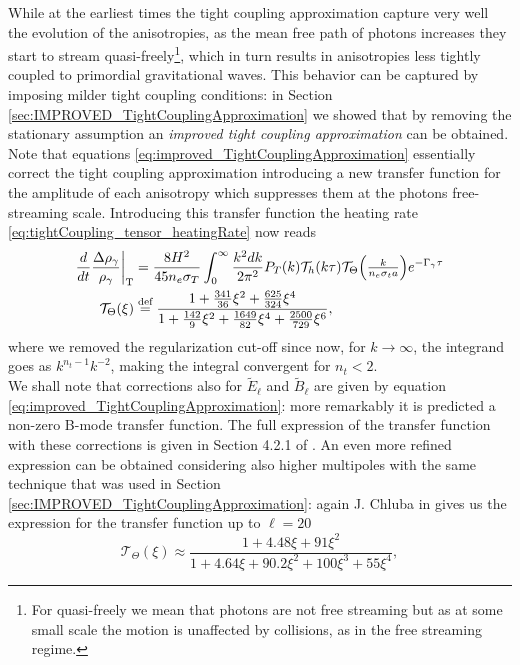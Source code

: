 While at the earliest times the tight coupling approximation capture very well the evolution of the anisotropies, as the mean free path of photons increases they start to stream quasi-freely\footnote{For quasi-freely we mean that photons are not free streaming but as at some small scale the motion is unaffected by collisions, as in the free streaming regime.}, which in turn results in anisotropies less tightly coupled to primordial gravitational waves. This behavior can be captured by imposing milder tight coupling conditions: in Section \ref{sec:IMPROVED_TightCouplingApproximation} we showed that by removing the stationary assumption an \emph{improved tight coupling approximation} can be obtained. Note that equations \eqref{eq:improved_TightCouplingApproximation} essentially correct the tight coupling approximation introducing a new transfer function for the amplitude of each anisotropy which suppresses them at the photons free-streaming scale. Introducing this transfer function the heating rate \eqref{eq:tightCoupling_tensor_heatingRate} now reads
\begin{align}\label{eq:impTightCoupling_tensor_heatingRate}
         \frac{d}{dt}\frac{\Delta\rho_\gamma}{\rho_\gamma}\bigg|_\text{T}&=\frac{8H^2}{45n_e\sigma_T}\int_0^{\infty}\frac{k^2dk}{2\pi^2}{P}_T (k)\mathcal{T}_h(k\tau)\mathcal{T}_\Theta \Big(\tfrac{k}{n_e\sigma_ta}\Big)e^{-\Gamma_\gamma\tau}\\
    \mathcal{T}_\Theta(\xi)&\stackrel{\text{def}}{=} \frac{1+\frac{341}{36}\xi^2+\frac{625}{324}\xi^4}{1+\frac{142}{9}\xi^2+\frac{1649}{82}\xi^4+\frac{2500}{729}\xi^6},\nonumber
\end{align}
where we removed the regularization cut-off since now, for $k\to\infty$, the integrand goes as $k^{n_t-1}k^{-2}$, making the integral convergent for $n_t<2$.\\ We shall note that corrections also for $\tilde E_\ell$ and $\tilde B_\ell$ are given by equation \eqref{eq:improved_TightCouplingApproximation}: more remarkably it is predicted a non-zero B-mode transfer function. The full expression of the transfer function with these corrections is given in Section 4.2.1 of \cite{Chluba_tens_diss}.
An even more refined expression can be obtained considering also higher multipoles with the same technique that was used in Section \ref{sec:IMPROVED_TightCouplingApproximation}: again J. Chluba in \cite{Chluba_tens_diss} gives us the expression for the transfer function up to $\ell=20$
\begin{equation}
    \mathcal{T}_\Theta(\xi)\approx\frac{1+4.48\xi+91\xi^2}{1+4.64\xi+90.2\xi^2+100\xi^3+55\xi^4},\label{eq:improved_THETA_Transfer}
\end{equation} 
